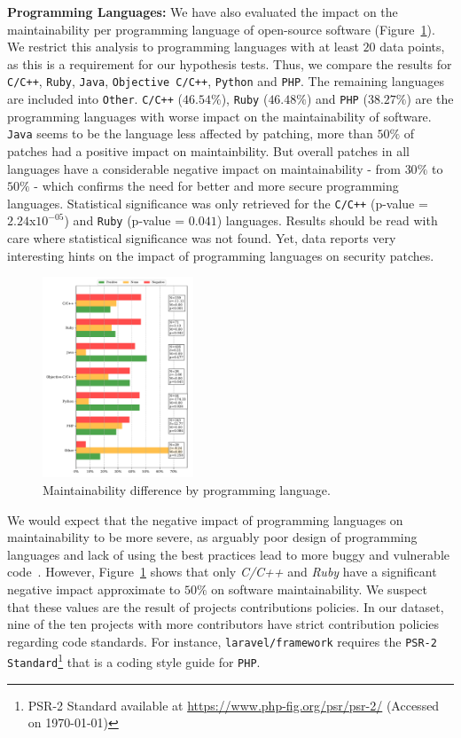\documentclass[10pt,conference]{IEEEtran}
\begin{document}
\textbf{Programming Languages:} We have also evaluated the impact on the maintainability per programming 
language of open-source software (Figure~\ref{fig:lang_main}). We restrict 
this analysis to programming languages with at least $20$ data points, as this 
is a requirement for our hypothesis tests. Thus, we compare the results for 
\texttt{C/C++}, \texttt{Ruby}, \texttt{Java}, \texttt{Objective C/C++}, 
\texttt{Python} and \texttt{PHP}. The remaining languages are included into 
\texttt{Other}. \texttt{C/C++} ($46.54\%$), \texttt{Ruby} ($46.48\%$) and 
\texttt{PHP} ($38.27\%$) are the programming languages with worse 
impact on the maintainability of software. \texttt{Java} seems to be the 
language less affected by patching, more than $50\%$ of patches had a positive 
impact on maintainbility. But overall patches in all languages have a 
considerable negative impact on maintainability - from $30\%$ to $50\%$ - which 
confirms the need for better and more secure programming languages. 
Statistical significance was only retrieved for the \texttt{C/C++} 
(p-value = $2.24$x$10^{-05}$) and \texttt{Ruby} (p-value = $0.041$) languages.
Results should be read with care where statistical significance was not found.
Yet, data reports very interesting hints on the impact of programming languages 
on security patches.

\begin{figure}[h]
  \centering
  \includegraphics[width=0.4\textwidth]{figures/main_per_language.pdf}
  \caption{Maintainability difference by programming language.}
  \label{fig:lang_main}  
\end{figure}

We would expect that the negative impact of programming languages on
maintainability to be more severe, as arguably poor design of programming
languages and lack of using the best practices lead to more buggy and vulnerable
code~\cite{Ray:2017:LSP:3144574.3126905, 2019arXiv190110220B}. However,
Figure~\ref{fig:lang_main} shows that only \emph{C/C++} and \emph{Ruby} have 
a significant negative impact approximate to $50\%$ on software 
maintainability. We suspect that these values are
the result of projects contributions policies. In our dataset, 
nine of the ten projects with more contributors have strict contribution policies regarding code
standards. For
instance, \texttt{laravel/framework} requires the \texttt{PSR-2
Standard}\footnote{PSR-2 Standard available at
\url{https://www.php-fig.org/psr/psr-2/} (Accessed on \today{})} that is a coding style guide for \texttt{PHP}.
\end{document}
